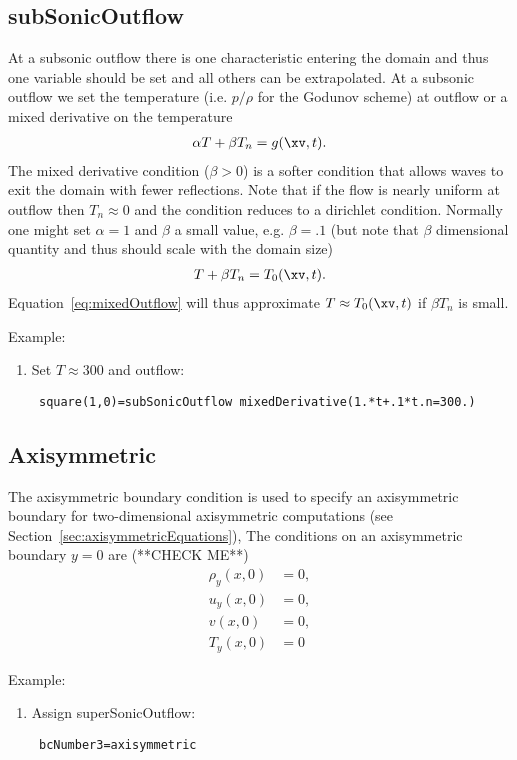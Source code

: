 \subsection{subSonicOutflow} \label{sec:bc:subSonicOutflow}


At a subsonic outflow there is one characteristic entering the domain and thus one variable
should be set and all others can be extrapolated. At a subsonic outflow we set the 
temperature (i.e. $p/\rho$ for the Godunov scheme) at outflow or a mixed derivative on the
temperature 
\begin{align}
   \alpha T + \beta T_n  = g(\xv,t).
\end{align}
The mixed derivative condition ($\beta>0$) is a softer condition that allows waves to exit
the domain with fewer reflections. Note that if the flow is nearly uniform at outflow then
$T_n \approx 0$ and the condition reduces to a dirichlet condition. Normally one might set
$\alpha=1$ and $\beta$ a small value, e.g. $\beta=.1$ (but note that $\beta$ dimensional quantity
and thus should scale with the domain size)
\begin{align}
   T + \beta T_n  = T_0(\xv,t). \label{eq:mixedOutflow}
\end{align}
Equation~\eqref{eq:mixedOutflow} will thus approximate $T \approx T_0(\xv,t)$ if $\beta T_n$ is small.

Example:
\begin{enumerate}
  \item Set $T\approx 300$ and outflow:
  \begin{flushleft}\tt
    square(1,0)=subSonicOutflow mixedDerivative(1.*t+.1*t.n=300.)
  \end{flushleft}
\end{enumerate}


\subsection{Axisymmetric} \label{sec:bc:axisymmetric}

The axisymmetric boundary condition is used to specify an axisymmetric boundary
for two-dimensional axisymmetric computations (see Section~\ref{sec:axisymmetricEquations}),
The conditions on an axisymmetric boundary $y=0$ are (**CHECK ME**)
\begin{align}
   \rho_y(x,0) &=0 , \\
   u_y(x,0) &=0 , \\
   v(x,0) &=0, \\
   T_y(x,0) &=0
\end{align}


Example:
\begin{enumerate}
  \item Assign superSonicOutflow:
  \begin{flushleft}\tt
    bcNumber3=axisymmetric
  \end{flushleft}
\end{enumerate}
